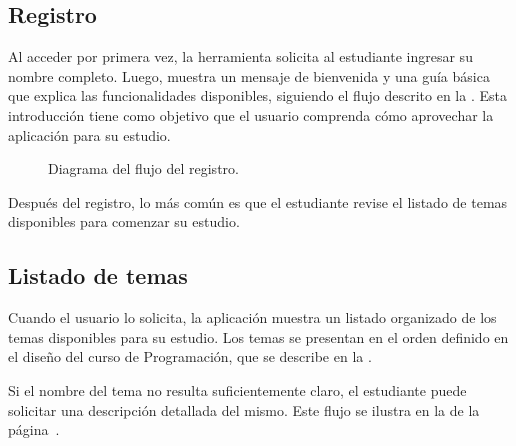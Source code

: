 \subsection{Registro}

Al acceder por primera vez, la herramienta solicita al estudiante ingresar su nombre completo. Luego, muestra un mensaje de bienvenida y una guía básica que explica las funcionalidades disponibles, siguiendo el flujo descrito en la . Esta introducción tiene como objetivo que el usuario comprenda cómo aprovechar la aplicación para su estudio.

\begin{figure}[h!]
  \centering
  \caption{Diagrama del flujo del registro.}\label{fig:register}
\end{figure}

Después del registro, lo más común es que el estudiante revise el listado de temas disponibles para comenzar su estudio.

\subsection{Listado de temas}

Cuando el usuario lo solicita, la aplicación muestra un listado organizado de los temas disponibles para su estudio. Los temas se presentan en el orden definido en el diseño del curso de Programación, que se describe en la .

Si el nombre del tema no resulta suficientemente claro, el estudiante puede solicitar una descripción detallada del mismo. Este flujo se ilustra en la  de la página~\pageref{fig:topics}.

